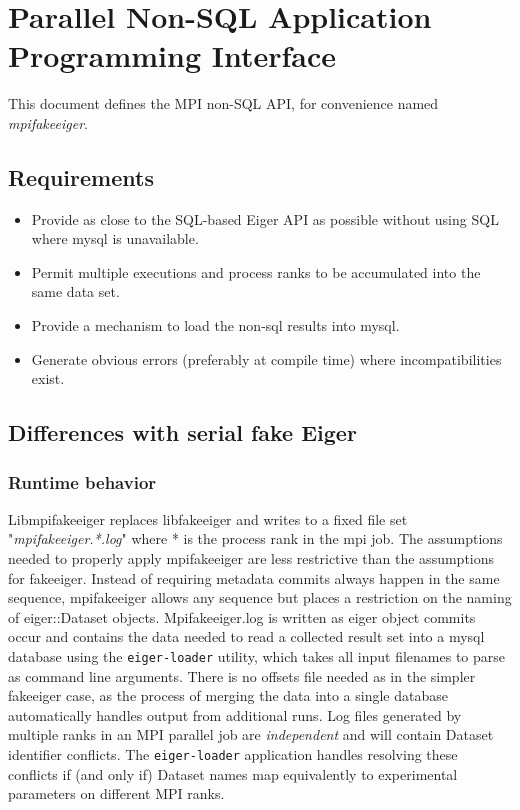 \section{Parallel Non-SQL Application Programming Interface}
\label{sec:mpifakeapi}
This document defines the MPI non-SQL API, for convenience named {\em mpifakeeiger}.

\subsection{Requirements}

\begin{itemize}
\item Provide as close to the SQL-based Eiger API as possible without using SQL where mysql is unavailable.

\item Permit multiple executions and process ranks to be accumulated into the same data set.

\item Provide a mechanism to load the non-sql results into mysql.
 
\item Generate obvious errors (preferably at compile time) where incompatibilities exist.

\end{itemize}

\subsection{Differences with serial fake Eiger}

\subsubsection {Runtime behavior} 
Libmpifakeeiger replaces libfakeeiger and writes to a fixed file set "{\em mpifakeeiger.*.log}" where * is the process rank in the mpi job. The assumptions needed to properly apply mpifakeeiger are less restrictive than the assumptions for fakeeiger. Instead of requiring metadata commits always happen in the same sequence, mpifakeeiger allows any sequence but places a restriction on the naming of eiger::Dataset objects. Mpifakeeiger.log is written as eiger object commits occur and contains the data needed to read a collected result set into a mysql database using the \texttt{eiger-loader} utility, which takes all input filenames to parse as command line arguments. There is no offsets file needed as in the simpler fakeeiger case, as the process of merging the data into a single database automatically handles output from additional runs.
Log files generated by multiple ranks in an MPI parallel job are {\em independent} and will contain Dataset identifier conflicts. The \texttt{eiger-loader} application handles resolving these conflicts if (and only if) Dataset names map equivalently to experimental parameters on different MPI ranks.

